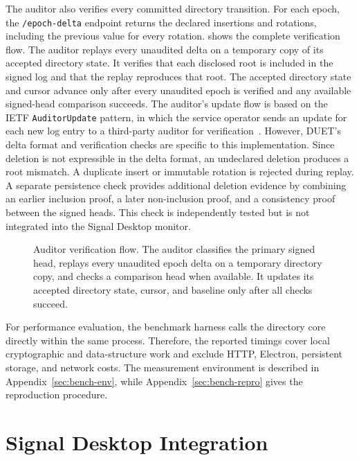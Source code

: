 The auditor also verifies every committed directory transition. For each epoch, the
\texttt{/epoch-delta} endpoint returns the declared insertions and rotations, including the previous
value for every rotation.  shows the complete verification flow. The
auditor replays every unaudited delta on a temporary copy of its accepted directory state. It verifies
that each disclosed root is included in the signed log and that the replay reproduces that root. The
accepted directory state and cursor advance only after every unaudited epoch is verified and any available
signed-head comparison succeeds. The auditor's update flow is based on the IETF
\texttt{AuditorUpdate} pattern, in which the service operator sends an update for each new log entry
to a third-party auditor for
verification~\cite[Section~15.2]{ietf-keytrans-protocol}. However, DUET's delta format and
verification checks are specific to this implementation. Since deletion is not expressible in the
delta format, an undeclared deletion produces a root mismatch. A duplicate insert or immutable
rotation is rejected during replay. A separate persistence check provides additional deletion
evidence by combining an earlier inclusion proof, a later non-inclusion proof, and a consistency
proof between the signed heads. This check is independently tested but is not integrated into the
Signal Desktop monitor.

\begin{figure}[htbp]
\centering

\caption[Auditor verification flow.]{Auditor verification flow. The auditor classifies the primary
signed head, replays every unaudited epoch delta on a temporary directory copy, and checks a comparison head
when available. It updates its accepted directory state, cursor, and baseline only after all checks succeed.}
\label{fig:impl-transition-audit}
\end{figure}

For performance evaluation, the benchmark harness calls the directory core directly within the same
process. Therefore, the reported timings cover local cryptographic and data-structure work and
exclude HTTP, Electron, persistent storage, and network costs. The measurement environment is
described in Appendix~\ref{sec:bench-env}, while Appendix~\ref{sec:bench-repro} gives the
reproduction procedure.
\FloatBarrier

\section{Signal Desktop Integration}\label{sec:impl-signal}

